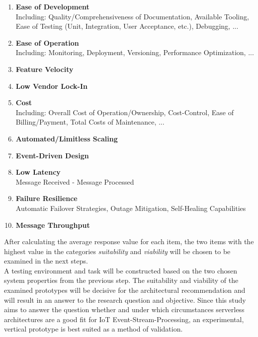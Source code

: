 \begin{enumerate}[nolistsep]
    \item \textbf{Ease of Development}\\
        Including: Quality/Comprehensiveness of Documentation, Available Tooling, Ease of Testing (Unit, Integration, User Acceptance, etc.), Debugging, ...
    \item \textbf{Ease of Operation}\\
        Including: Monitoring, Deployment, Versioning, Performance Optimization, ...
    \item \textbf{Feature Velocity}
    \item \textbf{Low Vendor Lock-In}
    \item \textbf{Cost}\\
        Including: Overall Cost of Operation/Ownership, Cost-Control, Ease of Billing/Payment, Total Costs of Maintenance, ...
    \item \textbf{Automated/Limitless Scaling}
    \item \textbf{Event-Driven Design}
    \item \textbf{Low Latency}\\
         Message Received - Message Processed
    \item \textbf{Failure Resilience}\\
         Automatic Failover Strategies, Outage Mitigation, Self-Healing Capabilities
    \item \textbf{Message Throughput}
\end{enumerate}

After calculating the average response value for each item, the two items with the highest value in the categories \textit{suitability} and \textit{viability} will be chosen to be examined in the next steps.\\
A testing environment and task will be constructed based on the two chosen system properties from the previous step. 
The suitability and viability of the examined prototypes will be decisive for the architectural recommendation and will result in an answer to the research question and objective.
Since this study aims to answer the question whether and under which circumstances serverless architectures are a good fit for IoT Event-Stream-Processing, an experimental, vertical prototype is best suited as a method of validation. 